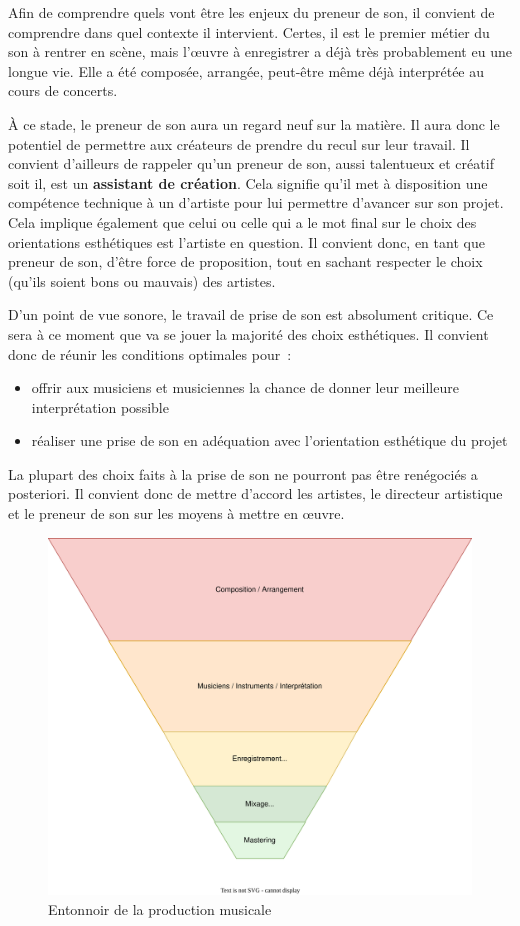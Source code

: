 \documentclass[
]{book}
\providecommand{\tightlist}{%
  \setlength{\itemsep}{0pt}\setlength{\parskip}{0pt}}
\begin{document}
Afin de comprendre quels vont être les enjeux du preneur de son, il convient de comprendre dans quel contexte il intervient. Certes, il est le premier métier du son à rentrer en scène, mais l'œuvre à enregistrer a déjà très probablement eu une longue vie. Elle a été composée, arrangée, peut-être même déjà interprétée au cours de concerts.

À ce stade, le preneur de son aura un regard neuf sur la matière. Il aura donc le potentiel de permettre aux créateurs de prendre du recul sur leur travail. Il convient d'ailleurs de rappeler qu'un preneur de son, aussi talentueux et créatif soit il, est un \textbf{assistant de création}. Cela signifie qu'il met à disposition une compétence technique à un d'artiste pour lui permettre d'avancer sur son projet. Cela implique également que celui ou celle qui a le mot final sur le choix des orientations esthétiques est l'artiste en question. Il convient donc, en tant que preneur de son, d'être force de proposition, tout en sachant respecter le choix (qu'ils soient bons ou mauvais) des artistes.

D'un point de vue sonore, le travail de prise de son est absolument critique. Ce sera à ce moment que va se jouer la majorité des choix esthétiques. Il convient donc de réunir les conditions optimales pour~:

\begin{itemize}
\tightlist
\item
  offrir aux musiciens et musiciennes la chance de donner leur meilleure interprétation possible
\item
  réaliser une prise de son en adéquation avec l'orientation esthétique du projet
\end{itemize}

La plupart des choix faits à la prise de son ne pourront pas être renégociés a posteriori. Il convient donc de mettre d'accord les artistes, le directeur artistique et le preneur de son sur les moyens à mettre en œuvre.

\begin{figure}

{\centering \includegraphics[width=0.8\linewidth]{_resources/diagrams/productionSonore} 

}

\caption{Entonnoir de la production musicale}\label{fig:unnamed-chunk-19}
\end{figure}
\end{document}
